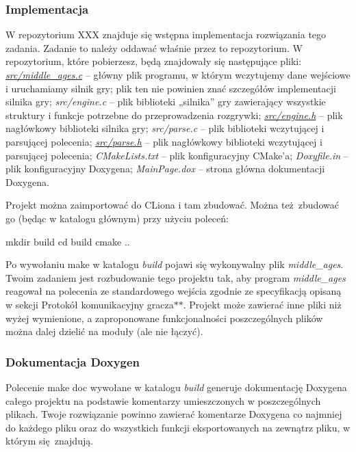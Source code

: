 \subsubsection*{Implementacja}

W repozytorium X\-X\-X znajduje się wstępna implementacja rozwiązania tego zadania. Zadanie to należy oddawać właśnie przez to repozytorium. W repozytorium, które pobierzesz, będą znajdowały się następujące pliki\-: {\itshape \hyperlink{middle__ages_8c}{src/middle\-\_\-ages.\-c}} – główny plik programu, w którym wczytujemy dane wejściowe i uruchamiamy silnik gry; plik ten nie powinien znać szczegółów implementacji silnika gry; {\itshape src/engine.\-c} – plik biblioteki „silnika” gry zawierający wszystkie struktury i funkcje potrzebne do przeprowadzenia rozgrywki; {\itshape \hyperlink{engine_8h}{src/engine.\-h}} – plik nagłówkowy biblioteki silnika gry; {\itshape src/parse.\-c} – plik biblioteki wczytującej i parsującej polecenia; {\itshape \hyperlink{parse_8h}{src/parse.\-h}} – plik nagłówkowy biblioteki wczytującej i parsującej polecenia; {\itshape C\-Make\-Lists.\-txt} – plik konfiguracyjny C\-Make'a; {\itshape Doxyfile.\-in} – plik konfiguracyjny Doxygena; {\itshape Main\-Page.\-dox} – strona główna dokumentacji Doxygena.

Projekt można zaimportować do C\-Liona i tam zbudować. Można też zbudować go (będąc w katalogu głównym) przy użyciu poleceń\-: \begin{DoxyVerb}mkdir build
cd build
cmake ..
\end{DoxyVerb}


Po wywołaniu {\ttfamily make} w katalogu {\itshape build} pojawi się wykonywalny plik {\itshape middle\-\_\-ages}. Twoim zadaniem jest rozbudowanie tego projektu tak, aby program {\itshape middle\-\_\-ages} reagował na polecenia ze standardowego wejścia zgodnie ze specyfikacją opisaną w sekcji Protokół komunikacyjny gracza$\ast$$\ast$. Projekt może zawierać inne pliki niż wyżej wymienione, a zaproponowane funkcjonalności poszczególnych plików można dalej dzielić na moduły (ale nie łączyć).

\subsubsection*{Dokumentacja Doxygen}

Polecenie {\ttfamily make doc} wywołane w katalogu {\itshape build} generuje dokumentację Doxygena całego projektu na podstawie komentarzy umieszczonych w poszczególnych plikach. Twoje rozwiązanie powinno zawierać komentarze Doxygena co najmniej do każdego pliku oraz do wszystkich funkcji eksportowanych na zewnątrz pliku, w którym się znajdują.

